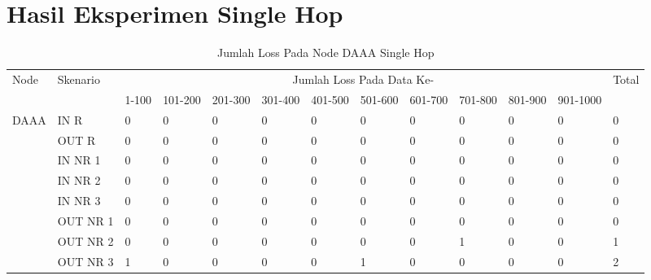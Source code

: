 \chapter{Hasil Eksperimen Single Hop}
\label{lamp:B}

\begin{table}[H]
  \centering
  \caption{Jumlah Loss Pada Node DAAA Single Hop}
    \begin{tabular}{|p{1cm}|p{1.9cm}|p{0.6cm}|p{0.6cm}|p{0.6cm}|p{0.6cm}|p{0.6cm}|p{0.6cm}|p{0.6cm}|p{0.6cm}|p{0.6cm}|p{0.6cm}|p{1cm}|}
    \hline
        \multirow{2}{*}{Node}&\multirow{2}{*}{Skenario}&\multicolumn{10}{|c|}{Jumlah Loss Pada Data Ke-}&\multirow{2}{*}{Total} \\\cline{3-12}
          & & 1-100 & 101-200 & 201-300 & 301-400 & 401-500 & 501-600 & 601-700 & 701-800 & 801-900 & 901-1000 & \\
        \hline
    \multirow{8}{*}{DAAA}  
    & IN R  & 0     & 0     & 0     & 0     & 0     & 0     & 0     & 0     & 0     & 0     & 0 \\
    & OUT R & 0     & 0     & 0     & 0     & 0     & 0     & 0     & 0     & 0     & 0     & 0 \\
    & IN NR 1 & 0     & 0     & 0     & 0     & 0     & 0     & 0     & 0     & 0     & 0     & 0 \\
          & IN NR 2 & 0     & 0     & 0     & 0     & 0     & 0     & 0     & 0     & 0     & 0     & 0 \\
          & IN NR 3 & 0     & 0     & 0     & 0     & 0     & 0     & 0     & 0     & 0     & 0     & 0 \\
          & OUT NR 1 & 0     & 0     & 0     & 0     & 0     & 0     & 0     & 0     & 0     & 0     & 0 \\
          & OUT NR 2 & 0     & 0     & 0     & 0     & 0     & 0     & 0     & 1     & 0     & 0     & 1 \\
          & OUT NR 3 & 1     & 0     & 0     & 0     & 0     & 1     & 0     & 0     & 0     & 0     & 2 \\
    
    \hline
    \end{tabular}%
  \label{tab:addlabel}%
\end{table}%

